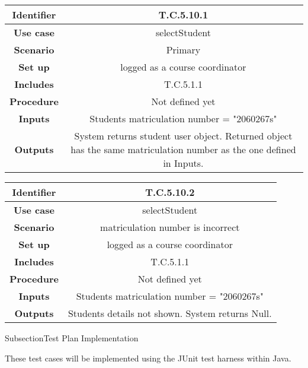 \begin{tabular}{|c|c|}
\hline \textbf{Identifier} & T.C.5.10.1\\
\hline \textbf{Use case} & selectStudent\\
\hline \textbf{Scenario} & Primary\\
\hline \textbf{Set up} & logged as a course coordinator\\
\hline \textbf{Includes} & T.C.5.1.1\\
\hline \textbf{Procedure} & Not defined yet\\
\hline \textbf{Inputs} & Students matriculation number = "2060267s"\\
\hline \textbf{Outputs} & System returns student user object. Returned object has the same matriculation number as the one defined in Inputs.\\
\hline
\end{tabular}

\begin{tabular}{|c|c|}
\hline \textbf{Identifier} & T.C.5.10.2\\
\hline \textbf{Use case} & selectStudent\\
\hline \textbf{Scenario} & matriculation number is incorrect\\
\hline \textbf{Set up} & logged as a course coordinator\\
\hline \textbf{Includes} & T.C.5.1.1\\
\hline \textbf{Procedure} & Not defined yet\\
\hline \textbf{Inputs} & Students matriculation number = "2060267s"\\
\hline \textbf{Outputs} & Students details not shown. System returns Null.\\
\hline
\end{tabular}


Subsection{Test Plan Implementation}

These test cases will be implemented using the JUnit test harness within Java. 


